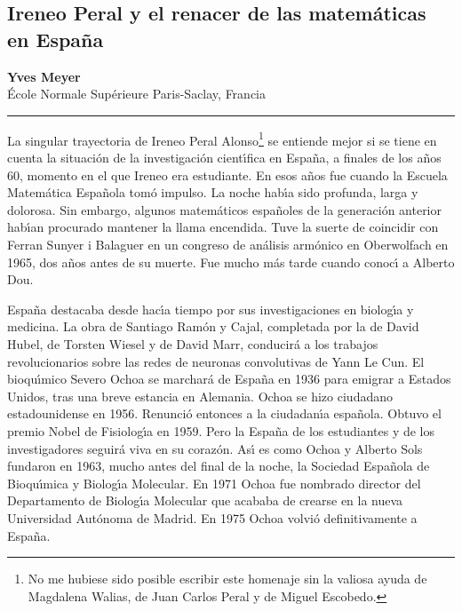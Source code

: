 

%
%

\subsection{Ireneo Peral y el renacer de las matem\'aticas en Espa\~na}

\begin{center}\large
\textbf{Yves Meyer}\\[1em] 
École Normale Supérieure Paris-Saclay, Francia\\
{\color{azulsema}\rule{.5\linewidth}{1pt}}
\end{center}


La singular trayectoria de Ireneo Peral Alonso\footnote{No me hubiese sido posible escribir este homenaje sin la valiosa  
ayuda de Magdalena Walias, de Juan Carlos Peral y de Miguel Escobedo.} se entiende mejor si se tiene en cuenta la situaci\'on de la investigaci\'on cient{\'\i}fica en Espa\~na, a finales de los a\~nos 60, momento en el que Ireneo era estudiante. En esos a\~nos fue cuando la Escuela Matem\'atica Espa\~nola tom\'o impulso. La noche hab{\'\i}a sido profunda, larga y dolorosa. Sin embargo, algunos matem\'aticos espa\~noles de la generaci\'on anterior hab{\'\i}an procurado mantener la llama encendida. Tuve la suerte de coincidir con Ferran Sunyer i Balaguer en un congreso de an\'alisis arm\'onico en Oberwolfach en 1965, dos a\~nos antes de su muerte. Fue mucho m\'as tarde cuando conoc{\'\i} a Alberto Dou.



Espa\~na destacaba desde hac{\'\i}a tiempo por sus investigaciones en biolog{\'\i}a y medicina. La obra de Santiago Ram\'on y Cajal, completada por la de David Hubel, de Torsten Wiesel y de David Marr, conducir\'a a los trabajos revolucionarios sobre las redes de neuronas convolutivas de Yann Le Cun. El bioqu{\'\i}mico Severo Ochoa se marchar\'a de Espa\~na en 1936 para emigrar a Estados Unidos, tras una breve estancia en Alemania. Ochoa se hizo ciudadano estadounidense en 1956. Renunci\'o entonces a la ciudadan{\'\i}a  espa\~nola. Obtuvo el premio Nobel de Fisiolog{\'\i}a en 1959. Pero la Espa\~na de los estudiantes y de los investigadores seguir\'a viva en su coraz\'on. As{\'\i} es como Ochoa y Alberto Sols fundaron en 1963, mucho antes del final de la noche, la Sociedad Espa\~nola de Bioqu{\'\i}mica y Biolog{\'\i}a Molecular. En 1971 Ochoa fue nombrado director del Departamento de Biolog{\'\i}a Molecular que acababa de crearse en la nueva Universidad Aut\'onoma de Madrid. En 1975 Ochoa volvi\'o definitivamente a Espa\~na.



